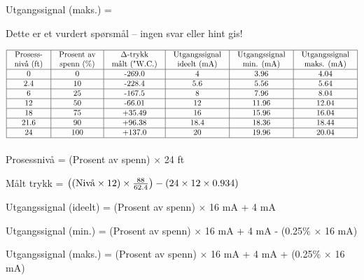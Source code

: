 Utgangssignal (maks.) = 



\vfil 

\eject






Dette er et vurdert spørsmål -- ingen svar eller hint gis!








$$\vbox{\offinterlineskip
\halign{\strut
\vrule \quad\hfil # \ \hfil & 
\vrule \quad\hfil # \ \hfil & 
\vrule \quad\hfil # \ \hfil & 
\vrule \quad\hfil # \ \hfil & 
\vrule \quad\hfil # \ \hfil & 
\vrule \quad\hfil # \ \hfil \vrule \cr
\noalign{\hrule}
%
Prosess- & Prosent av & $\Delta$-trykk & Utgangssignal & Utgangssignal & Utgangssignal \cr
%
nivå (ft) & spenn (\%) & målt ("W.C.) & ideelt (mA) & min. (mA) & maks. (mA) \cr
%
\noalign{\hrule}
%
0  & 0 & -269.0 & 4 & 3.96 & 4.04 \cr
%
\noalign{\hrule}
%
2.4  & 10 & -228.4 & 5.6 & 5.56 & 5.64 \cr
%
\noalign{\hrule}
%
6  & 25 & -167.5 & 8 & 7.96 & 8.04 \cr
%
\noalign{\hrule}
%
12  & 50 & -66.01 & 12 & 11.96 & 12.04 \cr
%
\noalign{\hrule}
%
18  & 75 & +35.49 & 16 & 15.96 & 16.04 \cr
%
\noalign{\hrule}
%
21.6  & 90 & +96.38 & 18.4 & 18.36 & 18.44 \cr
%
\noalign{\hrule}
%
24  & 100 & +137.0 & 20 & 19.96 & 20.04 \cr
%
\noalign{\hrule}
} %
}$$ %

\vskip 10pt

Prosessnivå = (Prosent av spenn) $\times$ 24 ft

\vskip 10pt

Målt trykk = $\left( (\hbox{Nivå} \times 12) \times {88 \over 62.4} \right) - (24 \times 12 \times 0.934)$

\vskip 10pt

Utgangssignal (ideelt) = (Prosent av spenn) $\times$ 16 mA + 4 mA 

\vskip 10pt

Utgangssignal (min.) = (Prosent av spenn) $\times$ 16 mA + 4 mA - (0.25\% $\times$ 16 mA) 

\vskip 10pt

Utgangssignal (maks.) = (Prosent av spenn) $\times$ 16 mA + 4 mA + (0.25\% $\times$ 16 mA) 

\vskip 10pt



